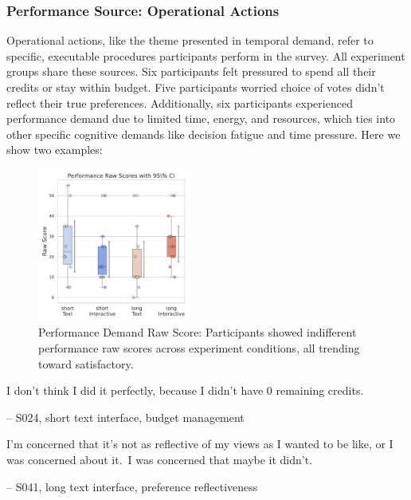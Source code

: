 \subsubsection{Performance Source: Operational Actions}
Operational actions, like the theme presented in temporal demand, refer to specific, executable procedures participants perform in the survey. All experiment groups share these sources. Six participants felt pressured to spend all their credits or stay within budget. Five participants worried choice of votes didn't reflect their true preferences. Additionally, six participants experienced performance demand due to limited time, energy, and resources, which ties into other specific cognitive demands like decision fatigue and time pressure. Here we show two examples:

\begin{figure} %
    \centering
    \includegraphics[width=0.45\textwidth, trim=0 13 0 13, clip]{content/image/cog/Performance_scores.pdf}
    \captionsetup{width=0.40\textwidth, justification=justified} %
    \caption{Performance Demand Raw Score: Participants showed indifferent performance raw scores across experiment conditions, all trending toward satisfactory.}
    \label{fig:performance_cog_score}
\end{figure}

\begin{displayquote}
I don't think I did it perfectly, because I didn't have 0 remaining credits.
    
\noindent \hfill -- S024, short text interface, budget management
\end{displayquote}

\begin{displayquote}
I'm concerned that it's not as reflective of my views as I wanted to be like, or I was concerned about it.~\bracketellipsis I was concerned that maybe it didn't.

\noindent \hfill -- S041, long text interface, preference reflectiveness
\end{displayquote}


